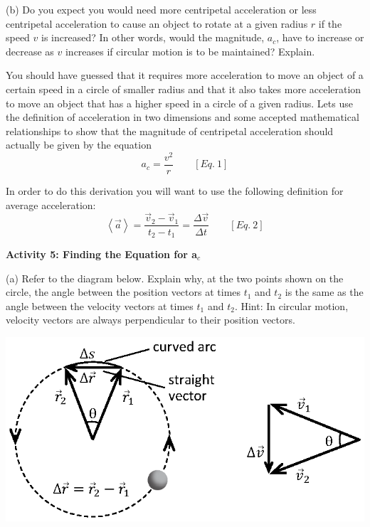(b) Do you expect you would need more centripetal acceleration or less centripetal
acceleration to cause an object to rotate at a given radius $r$ if the speed 
$v$
is increased? In other words, would the magnitude, \( a_{c} \), have to increase
or decrease as $v$ increases if circular motion is to be maintained? Explain.
\answerspace{20mm}

You should have guessed that it requires more acceleration to move an object
of a certain speed in a circle of smaller radius and that it also takes more
acceleration to move an object that has a higher speed in a circle of a given
radius. Lets use the definition of acceleration in two dimensions and some accepted
mathematical relationships to show that the magnitude of centripetal acceleration
should actually be given by the equation
\[
a_{c}=\frac{v^{2}}{r}\qquad [Eq.\: 1]\]


In order to do this derivation you will want to use the following definition
for average acceleration:
\[
\left\langle {\vec a}\right\rangle =\frac{{{\vec v}_{2}}-{{\vec v}_{1}}}
{t_{2}-t_{1}}=\frac{\Delta {\vec v}}{\Delta t}\qquad [Eq.\: 2]\]


\pagebreak[3]
\textbf{Activity 5: Finding the Equation for a\( _{c} \) }

(a) Refer to the diagram below. Explain why, at the two points shown on the
circle, the angle between the position vectors at times \( t_{1} \) and \( t_{2} \)
is the same as the angle between the velocity vectors at times \( t_{1} \)
and \( t_{2} \). Hint: In circular motion, velocity vectors are always perpendicular
to their position vectors.

\vspace{0.3cm}
{\par\raggedright \includegraphics{circ_motion/circ_motion_fig3_new.eps} \par}
\vspace{0.3cm}

